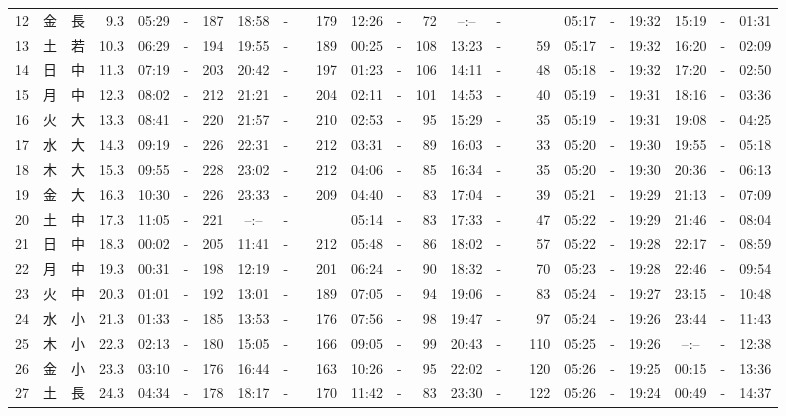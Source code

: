 \documentclass[12pt,a4j]{jsarticle}
\begin{document}
\begin{table}[htbp]
\begin{center}
{\begin{tabular}{|rc|cr|ccrccr|ccrccr|ccc|ccc|}
12 & 金 & 長 &  9.3 &  05:29 &-& 187 &  18:58 &-& 179 &  12:26 &-&  72 &  --:-- &-&~~~~~ & 05:17 & -& 19:32 & 15:19 & -& 01:31 \\
13 & 土 & 若 & 10.3 &  06:29 &-& 194 &  19:55 &-& 189 &  00:25 &-& 108 &  13:23 &-&  59 & 05:17 & -& 19:32 & 16:20 & -& 02:09 \\
14 & 日 & 中 & 11.3 &  07:19 &-& 203 &  20:42 &-& 197 &  01:23 &-& 106 &  14:11 &-&  48 & 05:18 & -& 19:32 & 17:20 & -& 02:50 \\
15 & 月 & 中 & 12.3 &  08:02 &-& 212 &  21:21 &-& 204 &  02:11 &-& 101 &  14:53 &-&  40 & 05:19 & -& 19:31 & 18:16 & -& 03:36 \\
16 & 火 & 大 & 13.3 &  08:41 &-& 220 &  21:57 &-& 210 &  02:53 &-&  95 &  15:29 &-&  35 & 05:19 & -& 19:31 & 19:08 & -& 04:25 \\
17 & 水 & 大 & 14.3 &  09:19 &-& 226 &  22:31 &-& 212 &  03:31 &-&  89 &  16:03 &-&  33 & 05:20 & -& 19:30 & 19:55 & -& 05:18 \\
18 & 木 & 大 & 15.3 &  09:55 &-& 228 &  23:02 &-& 212 &  04:06 &-&  85 &  16:34 &-&  35 & 05:20 & -& 19:30 & 20:36 & -& 06:13 \\
19 & 金 & 大 & 16.3 &  10:30 &-& 226 &  23:33 &-& 209 &  04:40 &-&  83 &  17:04 &-&  39 & 05:21 & -& 19:29 & 21:13 & -& 07:09 \\
20 & 土 & 中 & 17.3 &  11:05 &-& 221 &  --:-- &-&~~~~~ &  05:14 &-&  83 &  17:33 &-&  47 & 05:22 & -& 19:29 & 21:46 & -& 08:04 \\
21 & 日 & 中 & 18.3 &  00:02 &-& 205 &  11:41 &-& 212 &  05:48 &-&  86 &  18:02 &-&  57 & 05:22 & -& 19:28 & 22:17 & -& 08:59 \\
22 & 月 & 中 & 19.3 &  00:31 &-& 198 &  12:19 &-& 201 &  06:24 &-&  90 &  18:32 &-&  70 & 05:23 & -& 19:28 & 22:46 & -& 09:54 \\
23 & 火 & 中 & 20.3 &  01:01 &-& 192 &  13:01 &-& 189 &  07:05 &-&  94 &  19:06 &-&  83 & 05:24 & -& 19:27 & 23:15 & -& 10:48 \\
24 & 水 & 小 & 21.3 &  01:33 &-& 185 &  13:53 &-& 176 &  07:56 &-&  98 &  19:47 &-&  97 & 05:24 & -& 19:26 & 23:44 & -& 11:43 \\
25 & 木 & 小 & 22.3 &  02:13 &-& 180 &  15:05 &-& 166 &  09:05 &-&  99 &  20:43 &-& 110 & 05:25 & -& 19:26 & --:-- & -& 12:38 \\
26 & 金 & 小 & 23.3 &  03:10 &-& 176 &  16:44 &-& 163 &  10:26 &-&  95 &  22:02 &-& 120 & 05:26 & -& 19:25 & 00:15 & -& 13:36 \\
27 & 土 & 長 & 24.3 &  04:34 &-& 178 &  18:17 &-& 170 &  11:42 &-&  83 &  23:30 &-& 122 & 05:26 & -& 19:24 & 00:49 & -& 14:37 \\

\end{tabular}}
\end{center}
\end{table}
\end{document}
